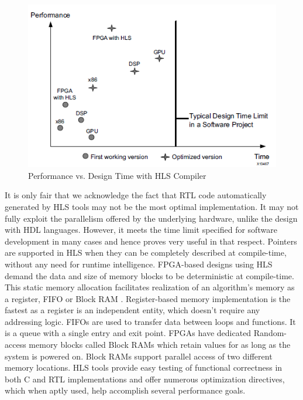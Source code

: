 \begin{figure}[h!]
  \centering
  \includegraphics[width=0.8\linewidth]{figures/graph-hlsdesign.png}
  \caption{Performance vs. Design Time with HLS Compiler
  \cite{xil_hls}}
  \label{fig:graph-hlsdesign}
\end{figure}
It is only fair that we acknowledge the fact that RTL code automatically generated by HLS tools may not be the most optimal implementation. It may not fully exploit the parallelism offered by the underlying hardware, unlike the design with HDL languages. However, it meets the time limit specified for software development in many cases and hence proves very useful in that respect.\newline \newline 
Pointers are supported in HLS when they can be completely described at compile-time, without any need for runtime intelligence. FPGA-based designs using HLS demand the data and size of memory blocks to be deterministic at compile-time. This static memory allocation facilitates realization of an algorithm’s memory as a register, FIFO or Block RAM \cite{xil_hls}. \newline \newline
Register-based memory implementation is the fastest as a register is an independent entity, which doesn’t require any addressing logic. FIFOs are used to transfer data between loops and functions. It is a queue with a single entry and exit point. FPGAs have dedicated Random-access memory blocks called Block RAMs which retain values for as long as the system is powered on. Block RAMs support parallel access of two different memory locations. \newline \newline
HLS tools provide easy testing of functional correctness in both C and RTL implementations and offer numerous optimization directives, which when aptly used, help accomplish several performance goals. 
